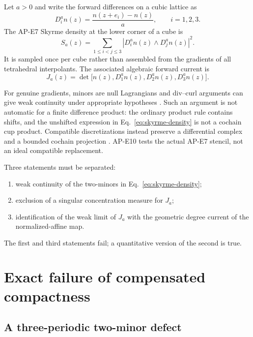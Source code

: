 \documentclass[11pt]{article}
\numberwithin{equation}{section}
\theoremstyle{definition}
\theoremstyle{remark}
\begin{document}
Let $a>0$ and write the forward differences on a cubic lattice as
\begin{equation}
 D_i^a n(z)=\frac{n(z+e_i)-n(z)}{a},\qquad i=1,2,3.
 \label{eq:forward}
\end{equation}
The AP-E7 Skyrme density at the lower corner of a cube is
\begin{equation}
 S_a(z)=\sum_{1\le i<j\le3}
 \left|D_i^an(z)\wedge D_j^an(z)\right|^2.
 \label{eq:skyrme-density}
\end{equation}
It is sampled once per cube rather than assembled from the gradients of all
tetrahedral interpolants.  The associated algebraic forward current is
\begin{equation}
 J_a(z)=\det\bigl[n(z),D_1^an(z),D_2^an(z),D_3^an(z)\bigr].
 \label{eq:forward-current}
\end{equation}

For genuine gradients, minors are null Lagrangians and div--curl arguments can
give weak continuity under appropriate hypotheses
\cite{BrianeCasadoDiaz2016}.  Such an argument is not automatic for a finite
difference product: the ordinary product rule contains shifts, and the
unshifted expression in Eq.~\eqref{eq:skyrme-density} is not a cochain cup
product.  Compatible discretizations instead preserve a differential complex
and a bounded cochain projection \cite{ArnoldFalkWinther2010}.  AP-E10 tests
the actual AP-E7 stencil, not an ideal compatible replacement.

Three statements must be separated:
\begin{enumerate}[label=(\roman*)]
\item weak continuity of the two-minors in Eq.~\eqref{eq:skyrme-density};
\item exclusion of a singular concentration measure for $J_a$;
\item identification of the weak limit of $J_a$ with the geometric degree
current of the normalized-affine map.
\end{enumerate}
The first and third statements fail; a quantitative version of the second is
true.

\section{Exact failure of compensated compactness}

\subsection{A three-periodic two-minor defect}
\end{document}

